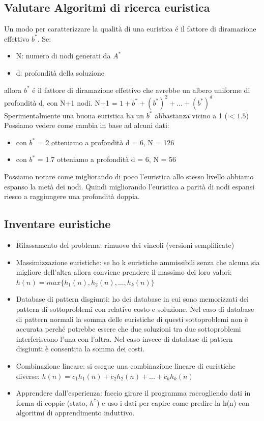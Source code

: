 \documentclass{article}
\begin{document}
\subsection{Valutare Algoritmi di ricerca euristica}
Un modo per caratterizzare la qualità di una euristica é il fattore di diramazione effettivo $b^*$.
Se:
\begin{itemize}
    \item N: numero di nodi generati da $A^*$
    \item d: profondità della soluzione
\end{itemize}
allora $b^*$ é il fattore di diramazione effettivo che avrebbe un albero uniforme di profondità d, con N+1 nodi. \newline
N+1 = $1 + b^* + (b^*)^2 + ... + (b^*)^d$ \newline
Sperimentalmente una buona euristica ha un $b^*$ abbastanza vicino a 1 ($< 1.5$) \newline
Possiamo vedere come cambia in base ad alcuni dati:
\begin{itemize}
    \item con $b^*$ = 2 otteniamo a profondità d = 6, N = 126
    \item con $b^*$ = 1.7 otteniamo a profondità d = 6, N = 56
\end{itemize}
Possiamo notare come migliorando di poco l'euristica allo stesso livello abbiamo espanso la metà dei nodi. Quindi migliorando l'euristica a parità di nodi espansi riesco a raggiungere una profondità doppia.
\clearpage

\subsection{Inventare euristiche}
\begin{itemize}
    \item Rilassamento del problema: rimuovo dei vincoli (versioni semplificate)
    \item Massimizzazione euristiche: se ho k euristiche ammissibili senza che alcuna sia migliore dell'altra allora conviene prendere il massimo dei loro valori: $h(n)=max\{h_1(n),h_2(n), ..., h_k(n)\}$
    \item Database di pattern disgiunti: ho dei database in cui sono memorizzati dei pattern di sottoproblemi con relativo costo e soluzione. Nel caso di database di pattern normali la somma delle euristiche di questi sottoproblemi non è accurata perché potrebbe essere che due soluzioni tra due sottoproblemi interferiscono l'una con l'altra. Nel caso invece di database di pattern disgiunti è consentita la somma dei costi.
    \item Combinazione lineare: si esegue una combinazione lineare di euristiche diverse: $h(n) = c_1h_1(n) + c_2h_2(n) + ... + c_kh_k(n)$
    \item Apprendere dall'esperienza: faccio girare il programma raccogliendo dati in forma di coppie (stato, $h^*$) e uso i dati per capire come predire la h(n) con algoritmi di apprendimento induttivo.
\end{itemize}
\end{document}

